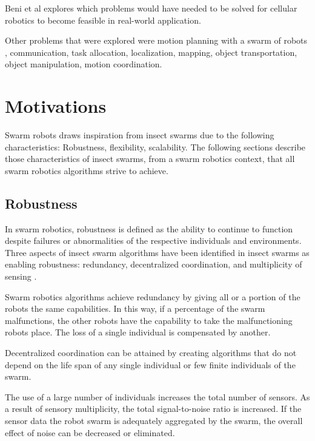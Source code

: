 Beni et al \cite{beni1991theoretical} explores which problems would have needed to be solved for cellular robotics to become feasible in real-world application.

Other problems that were explored were motion planning with a swarm of robots \cite{premvuti1990consideration,arai1989collision},  communication, task allocation, localization, mapping, object transportation, object manipulation, motion coordination.%

\section{Motivations}
\label{sec:first:advantages}


Swarm robots draws inspiration from insect swarms due to the following characteristics: Robustness, flexibility, scalability. The following sections describe those characteristics of insect swarms, from a swarm robotics context, that all swarm robotics algorithms strive to achieve. 

\subsection{Robustness}
\label{robustness}

In swarm robotics, robustness is defined as the ability to continue to function despite failures or abnormalities of the respective individuals and environments. Three aspects of insect swarm algorithms have been identified  in insect swarms as enabling robustness: redundancy, decentralized coordination, and multiplicity of sensing \cite{csahin2005swarm}.

Swarm robotics algorithms achieve redundancy by giving all or a portion of the robots the same capabilities. In this way, if a percentage  of the swarm malfunctions, the other robots have the capability to take the malfunctioning robots place. The loss of a single individual is compensated by another.

Decentralized coordination can be attained by creating algorithms that do not depend on the life span of any single individual or few finite individuals of the swarm.

The use of a large number of individuals increases the total number of sensors.  As a result of sensory multiplicity, the total signal-to-noise ratio is increased. If the sensor data the robot swarm is adequately aggregated by the swarm, the overall effect of noise can be decreased or eliminated. 

